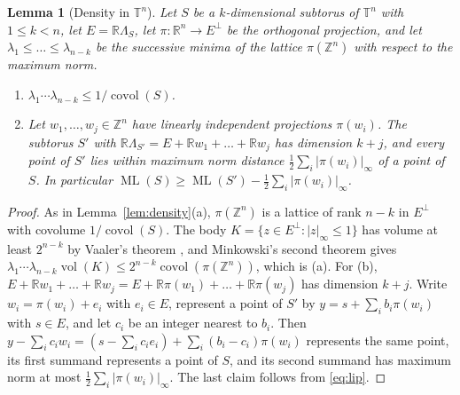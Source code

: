 \documentclass[12pt]{amsart}
\newtheorem{lemma}[theorem]{Lemma}
\theoremstyle{definition}\newtheorem{definition}[theorem]{Definition}
\theoremstyle{remark}\newtheorem{remark}[theorem]{Remark}
\newcommand{\Z}{\mathbb Z}\newcommand{\R}{\mathbb R}\newcommand{\T}{\mathbb T}
\newcommand{\ML}{\operatorname{ML}}
\newcommand{\covol}{\operatorname{covol}}
\newcommand{\supn}[1]{\lvert #1\rvert_\infty}
\begin{document}
\begin{lemma}[Density in $\T^n$]\label{lem:densityn}
Let $S$ be a $k$-dimensional subtorus of $\T^n$ with $1\le k<n$, let $E=\R\Lambda_S$, let $\pi:\R^n\to E^\perp$ be the orthogonal projection, and let $\lambda_1\le\dots\le\lambda_{n-k}$ be the successive minima of the lattice $\pi(\Z^n)$ with respect to the maximum norm.
\begin{enumerate}[label=\textup{(\alph*)},leftmargin=*]
\item $\lambda_1\cdots\lambda_{n-k}\le1/\covol(S)$.
\item Let $w_1,\dots,w_j\in\Z^n$ have linearly independent projections $\pi(w_i)$. The subtorus $S'$ with $\R\Lambda_{S'}=E+\R w_1+\dots+\R w_j$ has dimension $k+j$, and every point of $S'$ lies within maximum norm distance $\frac12\sum_i\supn{\pi(w_i)}$ of a point of $S$. In particular $\ML(S)\ge\ML(S')-\frac12\sum_i\supn{\pi(w_i)}$.
\end{enumerate}
\end{lemma}
\begin{proof}
As in Lemma~\ref{lem:density}(a), $\pi(\Z^n)$ is a lattice of rank $n-k$ in $E^\perp$ with covolume $1/\covol(S)$. The body $K=\{z\in E^\perp:\supn z\le1\}$ has volume at least $2^{n-k}$ by Vaaler's theorem \cite{Vaaler}, and Minkowski's second theorem \cite[Chapter~VIII]{Cassels} gives $\lambda_1\cdots\lambda_{n-k}\operatorname{vol}(K)\le2^{n-k}\covol(\pi(\Z^n))$, which is (a). For (b), $E+\R w_1+\dots+\R w_j=E+\R\pi(w_1)+\dots+\R\pi(w_j)$ has dimension $k+j$. Write $w_i=\pi(w_i)+e_i$ with $e_i\in E$, represent a point of $S'$ by $y=s+\sum_ib_i\pi(w_i)$ with $s\in E$, and let $c_i$ be an integer nearest to $b_i$. Then $y-\sum_ic_iw_i=(s-\sum_ic_ie_i)+\sum_i(b_i-c_i)\pi(w_i)$ represents the same point, its first summand represents a point of $S$, and its second summand has maximum norm at most $\frac12\sum_i\supn{\pi(w_i)}$. The last claim follows from \eqref{eq:lip}.
\end{proof}
\end{document}
